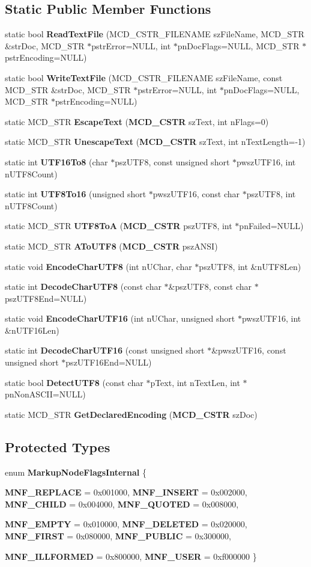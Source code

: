 \subsection*{Static Public Member Functions}
\begin{CompactItemize}
\item 
static bool {\bf ReadTextFile} (MCD\_\-CSTR\_\-FILENAME szFileName, MCD\_\-STR \&strDoc, MCD\_\-STR $\ast$pstrError=NULL, int $\ast$pnDocFlags=NULL, MCD\_\-STR $\ast$pstrEncoding=NULL)
\item 
static bool {\bf WriteTextFile} (MCD\_\-CSTR\_\-FILENAME szFileName, const MCD\_\-STR \&strDoc, MCD\_\-STR $\ast$pstrError=NULL, int $\ast$pnDocFlags=NULL, MCD\_\-STR $\ast$pstrEncoding=NULL)
\item 
static MCD\_\-STR {\bf EscapeText} ({\bf MCD\_\-CSTR} szText, int nFlags=0)
\item 
static MCD\_\-STR {\bf UnescapeText} ({\bf MCD\_\-CSTR} szText, int nTextLength=-1)
\item 
static int {\bf UTF16To8} (char $\ast$pszUTF8, const unsigned short $\ast$pwszUTF16, int nUTF8Count)
\item 
static int {\bf UTF8To16} (unsigned short $\ast$pwszUTF16, const char $\ast$pszUTF8, int nUTF8Count)
\item 
static MCD\_\-STR {\bf UTF8ToA} ({\bf MCD\_\-CSTR} pszUTF8, int $\ast$pnFailed=NULL)
\item 
static MCD\_\-STR {\bf AToUTF8} ({\bf MCD\_\-CSTR} pszANSI)
\item 
static void {\bf EncodeCharUTF8} (int nUChar, char $\ast$pszUTF8, int \&nUTF8Len)
\item 
static int {\bf DecodeCharUTF8} (const char $\ast$\&pszUTF8, const char $\ast$pszUTF8End=NULL)
\item 
static void {\bf EncodeCharUTF16} (int nUChar, unsigned short $\ast$pwszUTF16, int \&nUTF16Len)
\item 
static int {\bf DecodeCharUTF16} (const unsigned short $\ast$\&pwszUTF16, const unsigned short $\ast$pszUTF16End=NULL)
\item 
static bool {\bf DetectUTF8} (const char $\ast$pText, int nTextLen, int $\ast$pnNonASCII=NULL)
\item 
static MCD\_\-STR {\bf GetDeclaredEncoding} ({\bf MCD\_\-CSTR} szDoc)
\end{CompactItemize}
\subsection*{Protected Types}
\begin{CompactItemize}
\item 
enum {\bf MarkupNodeFlagsInternal} \{ \par
{\bf MNF\_\-REPLACE} =  0x001000, 
{\bf MNF\_\-INSERT} =  0x002000, 
{\bf MNF\_\-CHILD} =  0x004000, 
{\bf MNF\_\-QUOTED} =  0x008000, 
\par
{\bf MNF\_\-EMPTY} =  0x010000, 
{\bf MNF\_\-DELETED} =  0x020000, 
{\bf MNF\_\-FIRST} =  0x080000, 
{\bf MNF\_\-PUBLIC} =  0x300000, 
\par
{\bf MNF\_\-ILLFORMED} =  0x800000, 
{\bf MNF\_\-USER} =  0xf000000
 \}
\end{CompactItemize}
